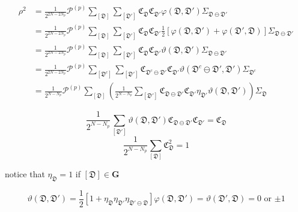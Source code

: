\documentclass[12font]{article}
\theoremstyle{definition}
\newcommand{\lr}[1]{\left(  #1  \right)}
\newcommand{\lrm}[1]{\left[  #1  \right]}
\newcommand{\bo}[1]{\mathbf{#1}}
\begin{document}
\begin{align*}
    \rho^2 
    &= 
    \frac{1}{2^{2N-2N_p}}
    \mathcal{P}^{(p)}
    \sum_{[\mathfrak{D}]}\sum_{[\mathfrak{D}']}
    \mathfrak{C}_{\mathfrak{D}}
    \mathfrak{C}_{\mathfrak{D}'}
    \varphi(\mathfrak{D},\mathfrak{D}')
    \Sigma_{\mathfrak{D}\ominus\mathfrak{D}'}\\
    &=
    \frac{1}{2^{2N-2N_p}}
    \mathcal{P}^{(p)}
    \sum_{[\mathfrak{D}]}\sum_{[\mathfrak{D}']}
    \mathfrak{C}_{\mathfrak{D}}
    \mathfrak{C}_{\mathfrak{D}'}
    \frac{1}{2}
    \lrm{
    \varphi(\mathfrak{D},\mathfrak{D}')
    +
    \varphi(\mathfrak{D}',\mathfrak{D})
    }
    \Sigma_{\mathfrak{D}\ominus\mathfrak{D}'} \\
    &=
    \frac{1}{2^{2N-2N_p}}
    \mathcal{P}^{(p)}
    \sum_{[\mathfrak{D}]}\sum_{[\mathfrak{D}']}
    \mathfrak{C}_{\mathfrak{D}}
    \mathfrak{C}_{\mathfrak{D}'}
    \vartheta(\mathfrak{D},\mathfrak{D}')
    \Sigma_{\mathfrak{D}\ominus\mathfrak{D}'} \\
    &= 
    \frac{1}{2^{2N-2N_p}}
    \mathcal{P}^{(p)}
    \sum_{[\mathfrak{D}^c]}\sum_{[\mathfrak{D}']}
    \mathfrak{C}_{\mathfrak{D}^c\ominus\mathfrak{D}'}
    \mathfrak{C}_{\mathfrak{D}'}
    \vartheta(\mathfrak{D}^c\ominus\mathfrak{D}',\mathfrak{D}')
    \Sigma_{\mathfrak{D}^c} \\
    &=
    \frac{1}{2^{N-N_p}}
    \mathcal{P}^{(p)}
    \sum_{[\mathfrak{D}]}
    \lr{
        \frac{1}{2^{N-N_p}}
        \sum_{[\mathfrak{D}']}
        \mathfrak{C}_{\mathfrak{D}\ominus\mathfrak{D}'}
        \mathfrak{C}_{\mathfrak{D}'}
        \eta_{\mathfrak{D}'}
        \vartheta(\mathfrak{D},\mathfrak{D}')
    }
    \Sigma_{\mathfrak{D}}
\end{align*}

\begin{equation}\label{eq:strong-condition}
    \frac{1}{2^{N-N_p}}
    \sum_{[\mathfrak{D}']}
    \vartheta(\mathfrak{D},\mathfrak{D}')
    \mathfrak{C}_{\mathfrak{D}\ominus\mathfrak{D}'}
    \mathfrak{C}_{\mathfrak{D}'}
    =
    \mathfrak{C}_{\mathfrak{D}}
\end{equation}
\begin{equation}\label{eq:weak-condition}
    \frac{1}{2^{N-N_p}}
    \sum_{[\mathfrak{D}]}
    \mathfrak{C}_{\mathfrak{D}}^2
    =
    1
\end{equation}

notice that $\eta_{\mathfrak{D}}=1$ if $[\mathfrak{D}]\in \bo{G}$

\[
    \vartheta(\mathfrak{D},\mathfrak{D}') 
    = 
    \frac{1}{2}
    \lrm{
    1
    +
    \eta_{\mathfrak{D}}
    \eta_{\mathfrak{D}'}
    \eta_{\mathfrak{D}'\ominus\mathfrak{D}}
    }\varphi(\mathfrak{D},\mathfrak{D}')
    =
    \vartheta(\mathfrak{D}',\mathfrak{D})
    =
    \text{$0$ or $\pm 1$}
\]
\end{document}
